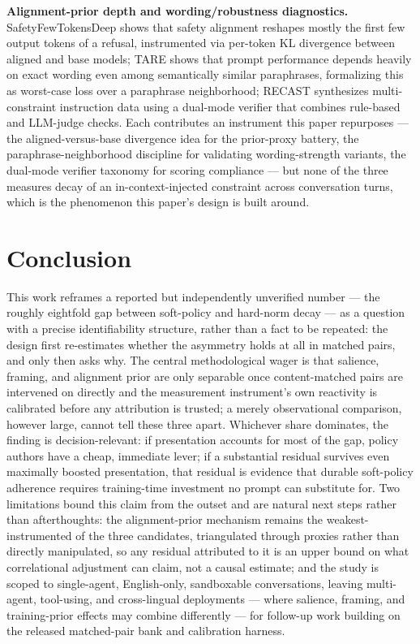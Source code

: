 \documentclass[11pt]{article}
\begin{document}
\textbf{Alignment-prior depth and wording/robustness diagnostics.} SafetyFewTokensDeep shows that safety alignment reshapes mostly the first few output tokens of a refusal, instrumented via per-token KL divergence between aligned and base models; TARE shows that prompt performance depends heavily on exact wording even among semantically similar paraphrases, formalizing this as worst-case loss over a paraphrase neighborhood; RECAST synthesizes multi-constraint instruction data using a dual-mode verifier that combines rule-based and LLM-judge checks. Each contributes an instrument this paper repurposes --- the aligned-versus-base divergence idea for the prior-proxy battery, the paraphrase-neighborhood discipline for validating wording-strength variants, the dual-mode verifier taxonomy for scoring compliance --- but none of the three measures decay of an in-context-injected constraint across conversation turns, which is the phenomenon this paper's design is built around.

\section{Conclusion}

This work reframes a reported but independently unverified number --- the roughly eightfold gap between soft-policy and hard-norm decay --- as a question with a precise identifiability structure, rather than a fact to be repeated: the design first re-estimates whether the asymmetry holds at all in matched pairs, and only then asks why. The central methodological wager is that salience, framing, and alignment prior are only separable once content-matched pairs are intervened on directly and the measurement instrument's own reactivity is calibrated before any attribution is trusted; a merely observational comparison, however large, cannot tell these three apart. Whichever share dominates, the finding is decision-relevant: if presentation accounts for most of the gap, policy authors have a cheap, immediate lever; if a substantial residual survives even maximally boosted presentation, that residual is evidence that durable soft-policy adherence requires training-time investment no prompt can substitute for. Two limitations bound this claim from the outset and are natural next steps rather than afterthoughts: the alignment-prior mechanism remains the weakest-instrumented of the three candidates, triangulated through proxies rather than directly manipulated, so any residual attributed to it is an upper bound on what correlational adjustment can claim, not a causal estimate; and the study is scoped to single-agent, English-only, sandboxable conversations, leaving multi-agent, tool-using, and cross-lingual deployments --- where salience, framing, and training-prior effects may combine differently --- for follow-up work building on the released matched-pair bank and calibration harness.
\end{document}
